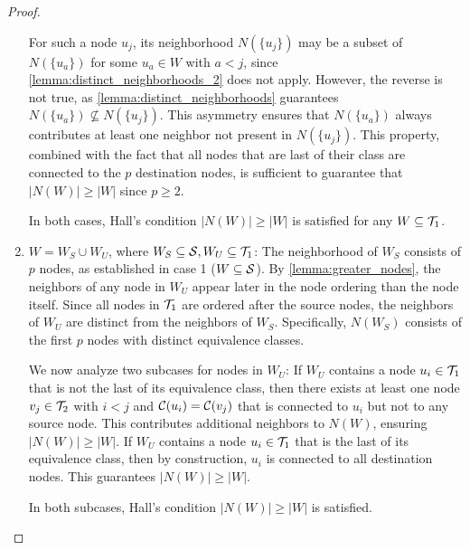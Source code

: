 \begin{proof}
\begin{enumerate}[leftmargin=25pt]
        For such a node $u_j$, its neighborhood $N(\{u_j\})$ may be a subset of $N(\{u_a\})$ for some $u_a \in W$ with $a < j$, since \cref{lemma:distinct_neighborhoods_2} does not apply. However, the reverse is not true, as \cref{lemma:distinct_neighborhoods} guarantees $N(\{u_a\}) \not\subseteq N(\{u_j\})$. This asymmetry ensures that $N(\{u_a\})$ always contributes at least one neighbor not present in $N(\{u_j\})$. This property, combined with the fact that all nodes that are last of their class are connected to the $p$ destination nodes, is sufficient to guarantee that $|N(W)| \ge |W|$ since $p \geq 2$.

        In both cases, Hall's condition $|N(W)| \geq |W|$ is satisfied for any $W \subseteq \mathcal{T}_{1}$.
        
        \item $W=W_S \cup W_U$, where $W_S \subseteq \mathcal{S}, W_U \subseteq \mathcal{T}_{1}$: The neighborhood of $W_S$ consists of $p$ nodes, as established in case 1 ($W \subseteq \mathcal{S}$). By \cref{lemma:greater_nodes}, the neighbors of any node in $W_U$ appear later in the node ordering than the node itself. Since all nodes in $\mathcal{T}_{1}$ are ordered after the source nodes, the neighbors of $W_U$ are distinct from the neighbors of $W_S$. Specifically, $N(W_S)$ consists of the first $p$ nodes with distinct equivalence classes.
        
        We now analyze two subcases for nodes in $W_U$: If $W_U$ contains a node $u_i \in \mathcal{T}_{1}$ that is not the last of its equivalence class, then there exists at least one node $v_j \in \mathcal{T}_{2}$ with $i < j$ and $\mathcal{C}(u_i) = \mathcal{C}(v_j)$ that is connected to $u_i$ but not to any source node. This contributes additional neighbors to $N(W)$, ensuring $|N(W)| \geq |W|$.
        If $W_U$ contains a node $u_i \in \mathcal{T}_{1}$ that is the last of its equivalence class, then by construction, $u_i$ is connected to all destination nodes. This guarantees $|N(W)| \geq |W|$.
        
        In both subcases, Hall's condition $|N(W)| \geq |W|$ is satisfied.
    \end{enumerate}
\end{proof}

